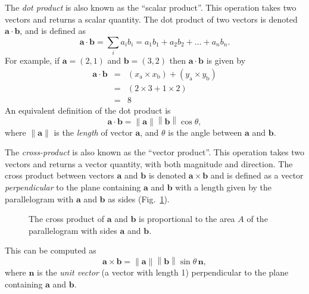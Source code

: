 \documentclass[a4paper]{article}
\newcommand{\bvec}[1]{\mathbf{#1}}
\newcommand{\norm}[1]{\left\lVert #1\right\rVert}
\begin{document}
The \emph{dot product} is also known as the ``scalar product''. This operation takes two vectors and returns a scalar quantity. The dot product of two vectors is denoted $\bvec{a}\cdot\bvec{b}$, and is defined as
\begin{equation}
\bvec{a}\cdot\bvec{b} = \sum_ia_ib_i = a_1b_1 + a_2b_2 + \ldots + a_nb_n.
\end{equation}
For example, if $\bvec{a}=(2,1)$ and $\bvec{b}=(3,2)$ then $\bvec{a}\cdot\bvec{b}$ is given by
\begin{eqnarray}
\bvec{a}\cdot\bvec{b} & = & (x_\mathrm{a} \times x_\mathrm{b})+ (y_\mathrm{a}\times y_\mathrm{b})\\
& = & (2\times3 + 1\times2) \\
& = & 8
\end{eqnarray}
An equivalent definition of the dot product is
\begin{equation}
\bvec{a}\cdot\bvec{b} = \norm{\bvec{a}}\norm{\bvec{b}}\cos\theta,
\end{equation}
where $\norm{\bvec{a}}$ is the \emph{length} of vector $\bvec{a}$, and $\theta$ is the angle between $\bvec{a}$ and $\bvec{b}$.

The \emph{cross-product} is also known as the ``vector product''. This operation takes two vectors and returns a vector quantity, with both magnitude and direction. The cross product between vectors $\bvec{a}$ and $\bvec{b}$ is denoted $\bvec{a}\times\bvec{b}$ and is defined as a vector \emph{perpendicular} to the plane containing $\bvec{a}$ and $\bvec{b}$ with a length given by the parallelogram with $\bvec{a}$ and $\bvec{b}$ as sides (Fig.~\ref{fig:cross_product}). 
\begin{figure}[tb]
  \centering
    \caption{\label{fig:cross_product}The cross product of $\bvec{a}$ and $\bvec{b}$ is proportional to the area $A$ of the parallelogram with sides $\bvec{a}$ and $\bvec{b}$.}
\end{figure}
This can be computed as
\begin{equation}
\bvec{a}\times\bvec{b} = \norm{\bvec{a}}\norm{\bvec{b}}\sin\theta\,\bvec{n},
\end{equation}
where $\bvec{n}$ is the \emph{unit vector} (a vector with length 1) perpendicular to the plane containing $\bvec{a}$ and $\bvec{b}$.
\end{document}
